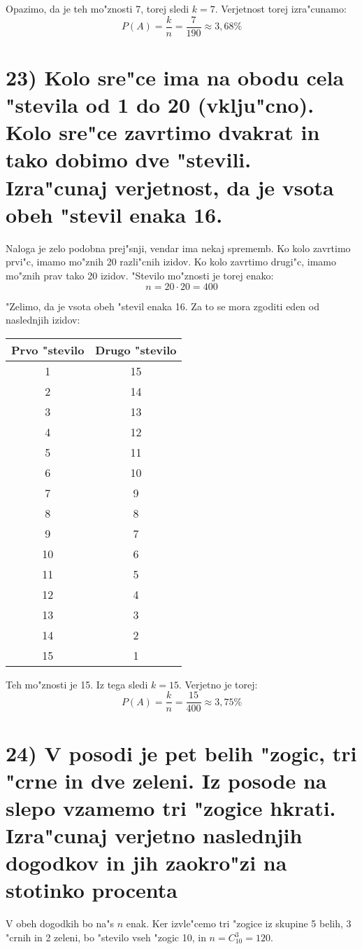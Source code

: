 \documentclass[a4paper, 12pt]{article}
\begin{document}
Opazimo, da je teh mo"znosti 7, torej sledi $k=7$. Verjetnost torej izra"cunamo:
\begin{equation*}
P(A) = \dfrac{k}{n} = \dfrac{7}{190} \approx 3,68\%
\end{equation*}

\section{23) Kolo sre"ce ima na obodu cela "stevila od 1 do 20 (vklju"cno). Kolo sre"ce zavrtimo dvakrat in tako dobimo dve "stevili. Izra"cunaj verjetnost, da je vsota obeh "stevil enaka 16.}
Naloga je zelo podobna prej"snji, vendar ima nekaj sprememb. Ko kolo zavrtimo prvi"c, imamo mo"znih 20 razli"cnih izidov. Ko kolo zavrtimo drugi"c, imamo mo"znih prav tako 20 izidov. "Stevilo mo"znosti je torej enako:
\begin{equation*}
n = 20 \cdot 20 = 400
\end{equation*}

"Zelimo, da je vsota obeh "stevil enaka 16. Za to se mora zgoditi eden od naslednjih izidov:
\begin{table}[!htbp]
	\centering
	\begin{tabular}{c|c}
		\textbf{Prvo "stevilo} & \textbf{Drugo "stevilo} \\ \hline
		1 & 15 \\
		2 & 14 \\
		3 & 13 \\
		4 & 12 \\
		5 & 11 \\
		6 & 10 \\
		7 & 9 \\ 
		8 & 8 \\
		9 & 7 \\
		10 & 6 \\
		11 & 5 \\
		12 & 4 \\
		13 & 3 \\
		14 & 2 \\
		15 & 1
	\end{tabular}
\end{table}

Teh mo"znosti je 15. Iz tega sledi $k = 15$. Verjetno je torej:
\begin{equation*}
P(A) = \dfrac{k}{n} = \dfrac{15}{400} \approx 3,75\%
\end{equation*}

\section*{24) V posodi je pet belih "zogic, tri "crne in dve zeleni. Iz posode na slepo vzamemo tri "zogice hkrati. Izra"cunaj verjetno naslednjih dogodkov in jih zaokro"zi na stotinko procenta}
V obeh dogodkih bo na"s $n$ enak. Ker izvle"cemo tri "zogice iz skupine 5 belih, 3 "crnih in 2 zeleni, bo "stevilo vseh "zogic 10, in $n = C_{10}^3 = 120$.
\end{document}

